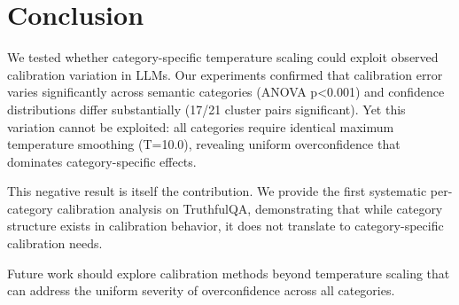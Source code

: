 \section{Conclusion}

We tested whether category-specific temperature scaling could exploit observed calibration variation in LLMs. Our experiments confirmed that calibration error varies significantly across semantic categories (ANOVA p<0.001) and confidence distributions differ substantially (17/21 cluster pairs significant). Yet this variation cannot be exploited: all categories require identical maximum temperature smoothing (T=10.0), revealing uniform overconfidence that dominates category-specific effects.

This negative result is itself the contribution. We provide the first systematic per-category calibration analysis on TruthfulQA, demonstrating that while category structure exists in calibration behavior, it does not translate to category-specific calibration needs.

Future work should explore calibration methods beyond temperature scaling that can address the uniform severity of overconfidence across all categories.
